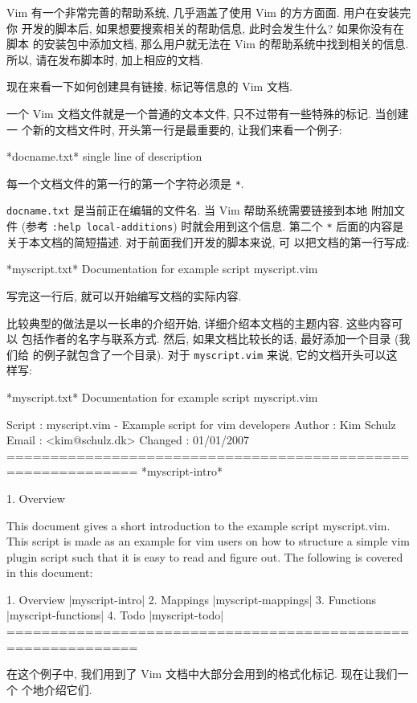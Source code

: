 Vim 有一个非常完善的帮助系统, 几乎涵盖了使用 Vim 的方方面面. 用户在安装完你
开发的脚本后, 如果想要搜索相关的帮助信息, 此时会发生什么? 如果你没有在脚本
的安装包中添加文档, 那么用户就无法在 Vim 的帮助系统中找到相关的信息. 所以,
请在发布脚本时, 加上相应的文档.

现在来看一下如何创建具有链接, 标记等信息的 Vim 文档.

一个 Vim 文档文件就是一个普通的文本文件, 只不过带有一些特殊的标记. 当创建一
个新的文档文件时, 开头第一行是最重要的, 让我们来看一个例子:
\begin{vimcode}
*docname.txt* single line of description
\end{vimcode}
每一个文档文件的第一行的第一个字符必须是 \texttt{*}.

\texttt{docname.txt} 是当前正在编辑的文件名. 当 Vim 帮助系统需要链接到本地
附加文件 (参考 \texttt{:help local-additions}) 时就会用到这个信息. 第二个
\texttt{*} 后面的内容是关于本文档的简短描述. 对于前面我们开发的脚本来说, 可
以把文档的第一行写成:
\begin{vimcode}
*myscript.txt* Documentation for example script myscript.vim
\end{vimcode}
写完这一行后, 就可以开始编写文档的实际内容.

比较典型的做法是以一长串的介绍开始, 详细介绍本文档的主题内容. 这些内容可以
包括作者的名字与联系方式. 然后, 如果文档比较长的话, 最好添加一个目录 (我们给
的例子就包含了一个目录). 对于 \texttt{myscript.vim} 来说, 它的文档开头可以这
样写:
\begin{vimcode}
*myscript.txt* Documentation for example script myscript.vim

Script  : myscript.vim - Example script for vim developers
Author  : Kim Schulz
Email   : <kim@schulz.dk>
Changed : 01/01/2007
=============================================================
                                            *myscript-intro*

1. Overview~
\end{vimcode}
\begin{vimcode}
This document gives a short introduction to the example
script myscript.vim.
This script is made as an example for vim users on how to
structure a simple vim plugin script such that it is easy
to read and figure out.
The following is covered in this document:

    1. Overview					|myscript-intro|
	2. Mappings					|myscript-mappings|
	3. Functions				|myscript-functions|
	4. Todo						|myscript-todo|
=============================================================
\end{vimcode}
在这个例子中, 我们用到了 Vim 文档中大部分会用到的格式化标记. 现在让我们一个
个地介绍它们.

